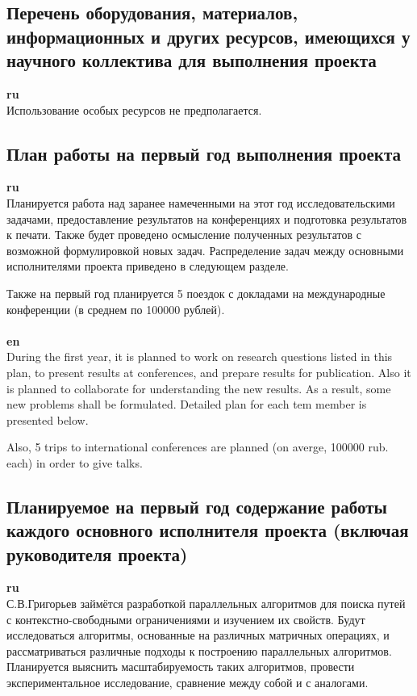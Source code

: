 \documentclass[12pt]{article}  %
\theoremstyle{remark}
\begin{document}
\subsection{Перечень оборудования, материалов, информационных и других ресурсов, имеющихся у научного коллектива для выполнения проекта}
\textbf{ru}\\
%
Использование особых ресурсов не предполагается.

\subsection{План работы на первый год выполнения проекта}

\textbf{ru}\\
%
Планируется работа над заранее намеченными на этот год исследовательскими задачами, предоставление результатов на конференциях и подготовка результатов к печати.
Также будет проведено осмысление полученных результатов с возможной формулировкой новых задач. Распределение задач между основными исполнителями проекта приведено в следующем разделе.

Также на первый год планируется 5 поездок с докладами на международные конференции (в среднем по 100000 рублей).
\\
\\
\textbf{en}\\
During the first year, it is planned to work on research questions listed in this plan, to present results at conferences, and prepare results for publication.
Also it is planned to collaborate for understanding the new results.
As a result, some new problems shall be formulated.
Detailed plan for each tem member is presented below.

Also, 5 trips to international conferences are planned (on averge, 100000 rub. each) in order to give talks.



\subsection{Планируемое на первый год содержание работы каждого основного исполнителя проекта (включая руководителя проекта)}

\textbf{ru}\\
%
С.В.Григорьев займётся разработкой параллельных алгоритмов для поиска путей с контекстно-свободными ограничениями и изучением их свойств.
Будут исследоваться алгоритмы, основанные на различных матричных операциях, и рассматриваться различные подходы к построению параллельных алгоритмов.
Планируется выяснить масштабируемость таких алгоритмов, провести экспериментальное исследование, сравнение между собой и с аналогами.
\end{document}
